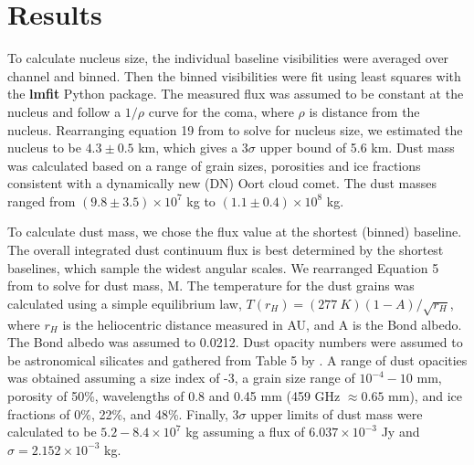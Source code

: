 \section{Results} \label{results}

To calculate nucleus size, the individual baseline visibilities were averaged over channel and binned. Then the binned visibilities were fit using least squares with the \textbf{lmfit} Python package. The measured flux was assumed to be constant at the nucleus and follow a \(1/\rho\) curve for the coma, where \(\rho\) is distance from the nucleus. Rearranging equation 19 from \cite{Delbo2002} to solve for nucleus size, we estimated the nucleus to be \(4.3 \pm 0.5\) km, which gives a \(3\sigma\) upper bound of 5.6 km. Dust mass was calculated based on a range of grain sizes, porosities and ice fractions consistent with a dynamically new (DN) Oort cloud comet. The dust masses ranged from \((9.8 \pm 3.5)\times 10^7\) kg to \((1.1 \pm 0.4)\times 10^8\) kg.

To calculate dust mass, we chose the flux value at the shortest (binned) baseline. The overall integrated dust continuum flux is best determined by the shortest baselines, which sample the widest angular scales. We rearranged Equation 5 from \cite{Roth2023} to solve for dust mass, M. The temperature for the dust grains was calculated using a simple equilibrium law, \(T\left( r_{H} \right) = (277\ K)(1 - A)/\sqrt{r_{H}}\), where \(r_{H}\) is the heliocentric distance measured in AU, and A is the Bond albedo. The Bond albedo was assumed to 0.0212. Dust opacity numbers were assumed to be astronomical silicates and gathered from Table 5 by \cite{Boissier2012}. A range of dust opacities was obtained assuming a size index of -3, a grain size range of \(10^{- 4} - 10\) mm, porosity of 50\%, wavelengths of 0.8 and 0.45 mm (459 GHz \(\approx0.65\) mm), and ice fractions of 0\%, 22\%, and 48\%. Finally, \(3\sigma\) upper limits of dust mass were calculated to be \(5.2 - 8.4 \times 10^{7}\) kg assuming a flux of \(6.037 \times 10^{- 3}\) Jy and \(\sigma = 2.152 \times 10^{- 3}\) kg.

